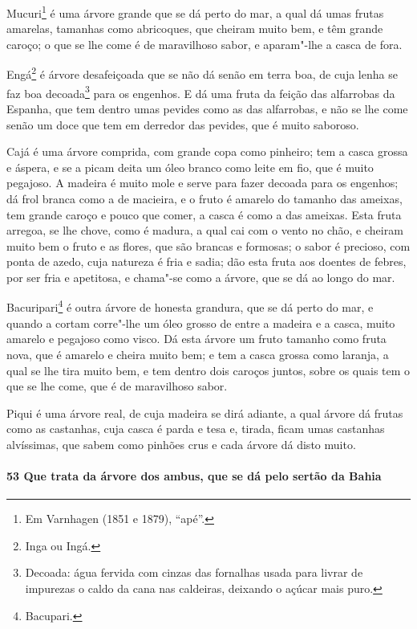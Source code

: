 Mucuri\footnote{ Em Varnhagen (1851 e 1879), ``apé''.} é uma árvore grande que se dá perto
do mar, a qual dá umas frutas amarelas, tamanhas como abricoques, que cheiram muito bem, e
têm grande caroço; o que se lhe come é de maravilhoso sabor, e aparam"-lhe a casca de fora.

Engá\footnote{ Inga ou Ingá.} é árvore desafeiçoada que se não dá senão em terra boa, de
cuja lenha se faz boa decoada\footnote{ Decoada: água fervida com cinzas das fornalhas
usada para livrar de impurezas o caldo da cana nas caldeiras, deixando o açúcar mais
puro.} para os engenhos. E dá uma fruta da feição das alfarrobas da Espanha, que tem
dentro umas pevides como as das alfarrobas, e não se lhe come senão um doce que tem em
derredor das pevides, que é muito saboroso.

Cajá é uma árvore comprida, com grande copa como pinheiro; tem a casca grossa e áspera, e
se a picam deita um óleo branco como leite em fio, que é muito pegajoso. A madeira é muito
mole e serve para fazer decoada para os engenhos; dá frol branca como a de macieira, e o
fruto é amarelo do tamanho das ameixas, tem grande caroço e pouco que comer, a casca é
como a das ameixas. Esta fruta arregoa, se lhe chove, como é madura, a qual cai com o
vento no chão, e cheiram muito bem o fruto e as flores, que são brancas e formosas; o
sabor é precioso, com ponta de azedo, cuja natureza é fria e sadia; dão esta fruta aos
doentes de febres, por ser fria e apetitosa, e chama"-se como a árvore, que se dá ao longo
do mar.

Bacuripari\footnote{ Bacupari.} é outra árvore de honesta grandura, que se dá perto do
mar, e quando a cortam corre"-lhe um óleo grosso de entre a madeira e a casca, muito
amarelo e pegajoso como visco. Dá esta árvore um fruto tamanho como fruta nova, que é
amarelo e cheira muito bem; e tem a casca grossa como laranja, a qual se lhe tira muito
bem, e tem dentro dois caroços juntos, sobre os quais tem o que se lhe come, que é de
maravilhoso sabor.

Piqui é uma árvore real, de cuja madeira se dirá adiante, a qual árvore dá frutas como as
castanhas, cuja casca é parda e tesa e, tirada, ficam umas castanhas alvíssimas, que sabem
como pinhões crus e cada árvore dá disto muito.

\paragraph{53 Que trata da árvore dos ambus, que se dá pelo sertão da Bahia}

